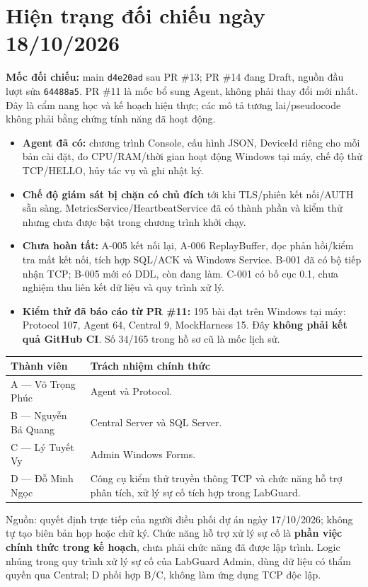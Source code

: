 
\section*{Hiện trạng đối chiếu ngày 18/10/2026}
\begin{summarybox}
\textbf{Mốc đối chiếu:} main \texttt{d4e20ad} sau PR \#13; PR \#14 đang Draft, nguồn đầu lượt sửa \texttt{64488a5}. PR \#11 là mốc bổ sung Agent, không phải thay đổi mới nhất. Đây là cẩm nang học và kế hoạch hiện thực; các mô tả tương lai/pseudocode không phải bằng chứng tính năng đã hoạt động.
\begin{itemize}[leftmargin=1.5em,itemsep=2pt]
\item \textbf{Agent đã có:} chương trình Console, cấu hình JSON, DeviceId riêng cho mỗi bản cài đặt, đo CPU/RAM/thời gian hoạt động Windows tại máy, chế độ thử TCP/HELLO, hủy tác vụ và ghi nhật ký.
\item \textbf{Chế độ giám sát bị chặn có chủ đích} tới khi TLS/phiên kết nối/AUTH sẵn sàng. MetricsService/HeartbeatService đã có thành phần và kiểm thử nhưng chưa được bật trong chương trình khởi chạy.
\item \textbf{Chưa hoàn tất:} A-005 kết nối lại, A-006 ReplayBuffer, đọc phản hồi/kiểm tra mất kết nối, tích hợp SQL/ACK và Windows Service. B-001 đã có bộ tiếp nhận TCP; B-005 mới có DDL, còn đang làm. C-001 có bố cục 0.1, chưa nghiệm thu liên kết dữ liệu và quy trình xử lý.
\item \textbf{Kiểm thử đã báo cáo từ PR \#11:} 195 bài đạt trên Windows tại máy: Protocol 107, Agent 64, Central 9, MockHarness 15. Đây \textbf{không phải kết quả GitHub CI}. Số 34/165 trong hồ sơ cũ là mốc lịch sử.
\end{itemize}
\end{summarybox}
\begin{center}
\small
\begin{tabularx}{\textwidth}{@{}lX@{}}
\toprule
\textbf{Thành viên} & \textbf{Trách nhiệm chính thức} \\
\midrule
A --- Võ Trọng Phúc & Agent và Protocol. \\
B --- Nguyễn Bá Quang & Central Server và SQL Server. \\
C --- Lý Tuyết Vy & Admin Windows Forms. \\
D --- Đỗ Minh Ngọc & Công cụ kiểm thử truyền thông TCP và chức năng hỗ trợ phân tích, xử lý sự cố tích hợp trong LabGuard. \\
\bottomrule
\end{tabularx}
\end{center}
Nguồn: quyết định trực tiếp của người điều phối dự án ngày 17/10/2026; không tự tạo biên bản họp hoặc chữ ký. Chức năng hỗ trợ xử lý sự cố là \textbf{phần việc chính thức trong kế hoạch}, chưa phải chức năng đã được lập trình. Logic nhúng trong quy trình xử lý sự cố của LabGuard Admin, dùng dữ liệu có thẩm quyền qua Central; D phối hợp B/C, không làm ứng dụng TCP độc lập.


